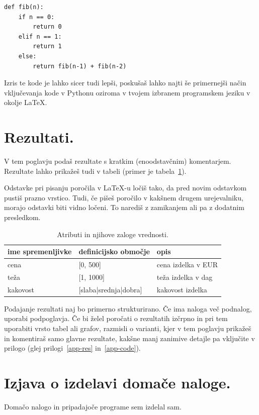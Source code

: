 \documentclass[a4paper,11pt]{article}
\begin{document}
\begin{lstlisting}
def fib(n):
    if n == 0:
        return 0
    elif n == 1:
        return 1
    else:
        return fib(n-1) + fib(n-2)
\end{lstlisting}

Izris te kode je lahko sicer tudi lepši, poskušaš lahko najti še
primernejši način vključevanja kode v Pythonu oziroma v tvojem izbranem
programskem jeziku v okolje \LaTeX{}.

\section{Rezultati.}

V tem poglavju podaš rezultate s kratkim (enoodstavčnim)
komentarjem. Rezultate lahko prikažeš tudi v tabeli (primer je
tabela~\ref{tab1}).

Odstavke pri pisanju poročila v LaTeX-u ločiš tako, da pred novim
odstavkom pustiš prazno vrstico. Tudi, če pišeš poročilo v kakšnem
drugem urejevalniku, morajo odstavki biti vidno ločeni. To narediš z
zamikanjem ali pa z dodatnim presledkom.

\begin{table}[htbp]
\caption{Atributi in njihove zaloge vrednosti.}
\label{tab1}
\begin{center}
\begin{tabular}{llp{3cm}}
\hline
ime spremenljivke & definicijsko območje & opis \\
\hline
cena & [0, 500] & cena izdelka v EUR\\
teža & [1, 1000] & teža izdelka v dag \\
kakovost & [slaba|srednja|dobra] & kakovost izdelka \\
\hline
\end{tabular}
\end{center}
\end{table}

Podajanje rezultati naj bo primerno strukturirano. Če ima naloga več
podnalog, uporabi podpoglavja. Če bi želel poročati o rezultatih
izčrpno in pri tem uporabiti vrsto tabel ali grafov, razmisli o
varianti, kjer v tem poglavju prikažeš in komentiraš samo glavne
rezultate, kakšne manj zanimive detajle pa vključite v prilogo (glej
prilogi~\ref{app-res} in~\ref{app-code}).

\section{Izjava o izdelavi domače naloge.}
Domačo nalogo in pripadajoče programe sem izdelal sam.
\end{document}

